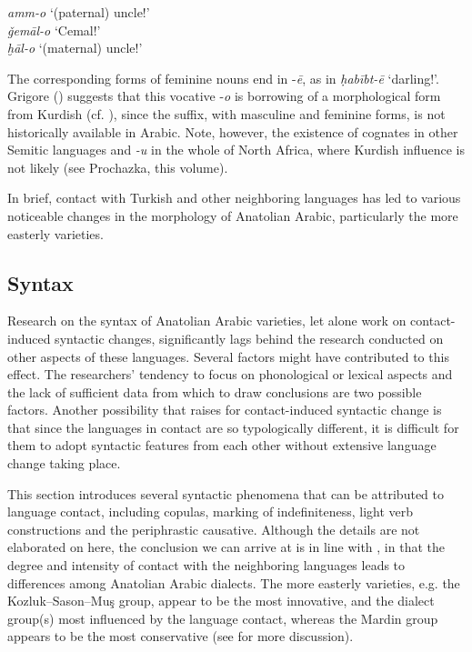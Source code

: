 \documentclass[output=paper]{langsci/langscibook}
\begin{document}
\ea
\noindent \textit{amm-o} `(paternal) uncle!'\\
\textit{ǧem\={a}l-o} `Cemal!'\\
\textit{ḫāl-o} `(maternal) uncle!'\\
\z

\noindent The corresponding forms of feminine nouns end in -\textit{\={e}}, as in \textit{ḥabībt-ē} `darling!'. Grigore (\citeyear[203]{Grigore2007book}) suggests that this vocative -\textit{o} is borrowing of a morphological form from Kurdish (cf. \citealt{HaigÖpengin2018}), since the suffix, with masculine and feminine forms, is not historically available in Arabic. Note, however, the existence of cognates in other Semitic languages and \textit{-u} in the whole of North Africa, where Kurdish influence is not likely (see Prochazka, this volume).

In brief, contact with Turkish and other neighboring languages has led to various noticeable changes in the morphology of Anatolian Arabic, particularly the more easterly varieties. 

\subsection{Syntax}
Research on the syntax of Anatolian Arabic varieties, let alone work on contact-induced syntactic changes, significantly lags behind the research conducted on other aspects of these languages. Several factors might have contributed to this effect. The researchers' tendency to focus on phonological or lexical aspects and the lack of sufficient data from which to draw conclusions  are two possible factors. Another possibility that \cite{Ingham2005} raises for contact-induced syntactic change is that since the languages in contact are so typologically different, it is difficult for them to adopt syntactic features from each other without extensive language change taking place. 

This section introduces several syntactic phenomena that can be attributed to language contact, including copulas, marking of indefiniteness, light verb constructions and the periphrastic causative. Although the details are not elaborated on here, the conclusion we can arrive at is in line with \cite{Ingham2005}, in that the degree and intensity of contact with the neighboring languages leads to differences among Anatolian Arabic dialects. The more easterly varieties, e.g. the Kozluk--Sason--Mu\c{s} group, appear to be the most innovative, and the dialect group(s) most influenced by the language contact, whereas the Mardin group appears to be the most conservative (see \citealt{Akkus2017,Jastrow2011anatolian} for more discussion).
\end{document}
